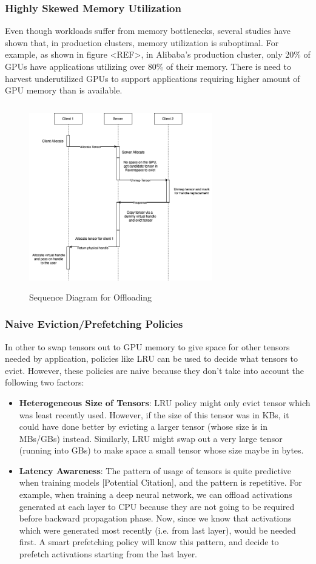 \documentclass{article}
\begin{document}
	\subsubsection{Highly Skewed Memory Utilization}
	Even though workloads suffer from memory bottlenecks, several studies have shown that, in production clusters, memory utilization
	is suboptimal. For example, as shown in figure <REF>, in Alibaba's production cluster, only 20\% of GPUs have applications
	utilizing over 80\% of their memory. There is need to harvest underutilized GPUs to support applications requiring 
	higher amount of GPU memory than is available.
	\begin{figure}[!htbp]
		\centering
		\includegraphics[height=8cm, width=8cm]{figures/Offloading.png}
		\caption{Sequence Diagram for Offloading}
	\end{figure}
	\FloatBarrier

	\subsubsection{Naive Eviction/Prefetching Policies} In other to swap tensors out to GPU memory to give space for other tensors needed by application,
	policies like LRU can be used to decide what tensors to evict. However, these policies are naive because they don't take into account the following two factors:
	\begin{itemize}
		\item \textbf{Heterogeneous Size of Tensors}: LRU policy might only evict tensor which was least recently used. However, 
		if the size of this tensor was in KBs, it could have done better by evicting a larger tensor (whose size is in MBs/GBs) instead. Similarly,
		LRU might swap out a very large tensor (running into GBs) to make space a small tensor whose size maybe in bytes.
		\item \textbf{Latency Awareness}: The pattern of usage of tensors is quite predictive when training models [Potential Citation], and the pattern is repetitive. For example,
		when training a deep neural network, we can offload activations generated at each layer to CPU because they are not going to be required before backward propagation phase.
		Now, since we know that activations which were generated most recently (i.e. from last layer), would be needed first.
		A smart prefetching policy will know this pattern, and decide to prefetch activations starting from the last layer.
	\end{itemize}
\end{document}
